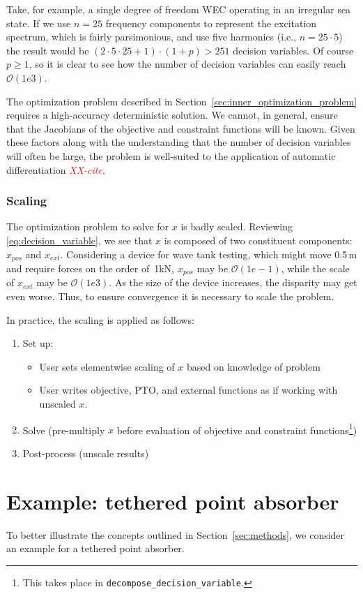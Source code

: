 \documentclass[]{article}
\newcommand{\todo}[1]{\textcolor{red}{\emph{#1}}}
\begin{document}
Take, for example, a single degree of freedom WEC operating in an irregular sea state.
If we use $n=25$ frequency components to represent the excitation spectrum, which is fairly parsimonious, and use five harmonics (i.e., $n=25\cdot5$) the result would be $(2\cdot 5 \cdot 25 + 1) \cdot (1 + p) > 251$ decision variables.
Of course $p \geq 1$, so it is clear to see how the number of decision variables can easily reach $\mathcal{O}(1e3)$.

The optimization problem described in Section~\ref{sec:inner_optimization_problem} requires a high-accuracy deterministic solution.
We cannot, in general, ensure that the Jacobians of the objective and constraint functions will be known.
Given these factors along with the understanding that the number of decision variables will often be large, the problem is well-suited to the application of automatic differentiation \todo{XX-cite}.

\subsubsection{Scaling}\label{sec:scaling}
The optimization problem to solve for $x$ is badly scaled.
Reviewing \eqref{eq:decision_variable}, we see that $x$ is composed of two constituent components: $x_{pos}$ and $x_{ext}$.
Considering a device for wave tank testing, which might move 0.5\,m and require forces on the order of \,1kN, $x_{pos}$ may be $\mathcal{O}(1e-1)$, while the scale of $x_{ext}$ may be $\mathcal{O}(1e3)$.
As the size of the device increases, the disparity may get even worse.
Thus, to ensure convergence it is necessary to scale the problem.

In practice, the scaling is applied as follows:

\begin{enumerate}
	\item Set up:
	\begin{itemize}
		\item User sets elementwise scaling of $x$ based on knowledge of problem
		\item User writes objective, PTO, and external functions as if working with unscaled $x$.
	\end{itemize}
	\item Solve (pre-multiply $x$ before evaluation of objective and constraint functions\footnote{This takes place in \texttt{{decompose\_decision\_variable}}.})
	\item Post-process (unscale results)
\end{enumerate}

\section{Example: tethered point absorber}\label{sec:example_tethered_point_absorber}

To better illustrate the concepts outlined in Section~\ref{sec:methods}, we consider an example for a tethered point absorber.

\end{document}

